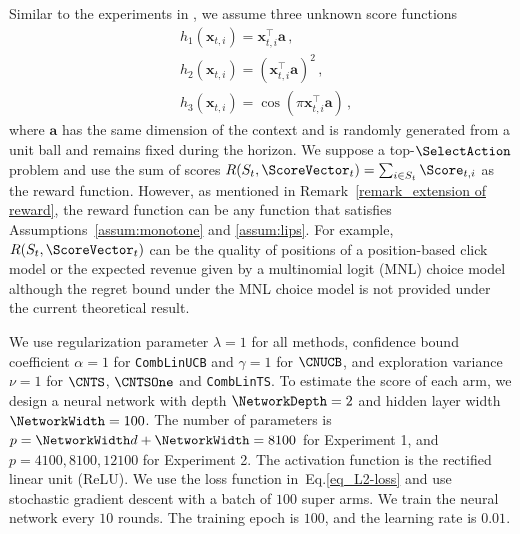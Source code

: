 \documentclass{article}
\theoremstyle{plain}
\begin{document}
Similar to the experiments in \citet{zhou2020neural}, we assume three unknown score functions
\begin{align*}
        & h_{1}(\mathbf{x}_{t,i}) = \mathbf{x}_{t,i}^{\top}\mathbf{a}\, ,        
        \\
        & h_{2}(\mathbf{x}_{t,i}) = (\mathbf{x}_{t,i}^{\top}\mathbf{a})^{2}\, ,
        \\
        & h_{3}(\mathbf{x}_{t,i}) = \cos(\pi \mathbf{x}_{t,i}^{\top}\mathbf{a}) \, ,
\end{align*}
where $\mathbf{a}$ has the same dimension of the context and is randomly generated from a unit ball and remains fixed during the horizon.
We suppose a top-$\SelectAction$ problem and use the sum of scores $R(S_t, \ScoreVector_t) = \sum_{i \in S_t} \Score_{t, i}$ as the reward function.  
However, as mentioned in Remark~\ref{remark_extension of reward}, the reward function can be any function that satisfies Assumptions~\ref{assum:monotone} and \ref{assum:lips}.  
For example, $R(S_t, \ScoreVector_t)$ can be the quality of positions of a position-based click model \cite{BanditAlgo} or the expected revenue given by a multinomial logit (MNL) choice model~\cite{oh2019thompson} although the regret bound under the MNL choice model is not provided under the current theoretical result.

We use regularization parameter $\lambda = 1$ for all methods, 
confidence bound coefficient $\alpha = 1$ for \texttt{CombLinUCB} and $\gamma = 1$ for $\CNUCB$, and exploration variance $\nu = 1$ for $\CNTS$, $\CNTSOne$ and \texttt{CombLinTS}.
To estimate the score of each arm, we design a neural network with depth $\NetworkDepth=2$ and hidden layer width $\NetworkWidth=100$. 
The number of parameters is $p=\NetworkWidth d + \NetworkWidth= 8100$ for Experiment 1, and $p={4100, 8100, 12100}$ for Experiment 2.
The activation function is the rectified linear unit (ReLU).
We use the loss function in~Eq.\eqref{eq_L2-loss} and
use stochastic gradient descent with a batch of $100$ super arms. 
We train the neural network every $10$ rounds.
The training epoch is $100$, and the learning rate is $0.01$.
\end{document}
